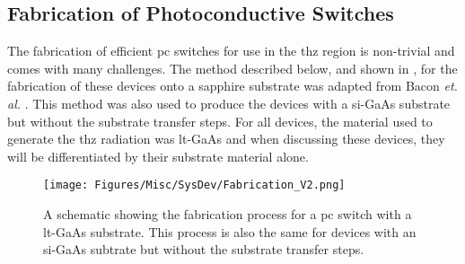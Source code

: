 \subsection{Fabrication of Photoconductive Switches}
The fabrication of efficient \acrshort{pc} switches for use in the \acrshort{thz} region is non\nobreakdash-trivial and comes with many challenges. The method described below, and shown in , for the fabrication of these devices onto a sapphire substrate was adapted from Bacon \textit{et. al.} \DIFdelbegin \DIFdel{~}\DIFdelend \cite{Bacon2016}. This method was also used to produce the devices with a \acrshort{si}\nobreakdash-GaAs substrate but without the substrate transfer steps. For all devices, the material used to generate the \acrshort{thz} radiation was \acrshort{lt}\nobreakdash-GaAs and when discussing these devices, they will be differentiated by their substrate material alone.

\begin{figure}[t]
    \centering
    \texttt{[image: Figures/Misc/SysDev/Fabrication\_V2.png]}
    \captionsetup{font = footnotesize, justification = centering}
    \caption[A Schematic showing the Fabrication Process for a Photoconductive Switch with a LT-GaAs Substrate]{A schematic showing the fabrication process for a \acrshort{pc} switch with a \acrshort{lt}\nobreakdash-GaAs substrate. This process is also the same for devices with an \acrshort{si}\nobreakdash-GaAs subtrate but without the substrate transfer steps.}
    \label{fig:fabrication}
\end{figure}

